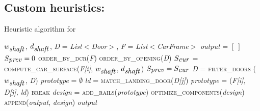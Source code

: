 \subsection{Custom heuristics: \liftcreatehr{}}
\label{sec:baseline}

\begin{algorithm}[t]
	\caption{Heuristic algorithm for \liftcreatehr{}}
	\label{alg:hr}
	\small
	\begin{algorithmic}[1]
		{$w_{\mbox{\emph{shaft}}}$, $d_{\mbox{\emph{shaft}}}$, \emph{D} = \emph{List}$<$\emph{Door}$>$, 
			\emph{F} = \emph{List}$<$\emph{CarFrame}$>$}
		\State \emph{output} = $[\:]$ 
		\State $S_{\mbox{\emph{prev}}} = 0$ 
		\State \textsc{order\_by\_dcr}(\emph{F})
		\State \textsc{order\_by\_opening}(\emph{D})
		\State $S_{\mbox{\emph{cur}}}$ =
		\textsc{compute\_car\_surface}(\emph{F[i]}, $w_{\mbox{\emph{shaft}}}$, $d_{\mbox{\emph{shaft}}}$)
		\State $S_{\mbox{\emph{prev}}} = S_{\mbox{\emph{cur}}}$
		\State \emph{D} = \textsc{filter\_doors}
		($w_{\mbox{\emph{shaft}}}$, \emph{D})
		\State \emph{prototype} = $\emptyset$ 
		\State \emph{ld} = 
		\textsc{match\_landing\_door}(\emph{D[j]})
		\State \emph{prototype} = (\emph{F[i], D[j], ld})
		\State \textsc{break}
		\EndIf
		\EndFor
		\State \emph{design} = \textsc{add\_rails}(\emph{prototype})
		\State \textsc{optimize\_components}(\emph{design})
		\State \textsc{append}(\emph{output}, \emph{design})
		\EndIf
		\EndIf
		\EndIf
		\EndFor
		\State \Return \emph{output}
		\EndFunction
	\end{algorithmic}
\end{algorithm}

